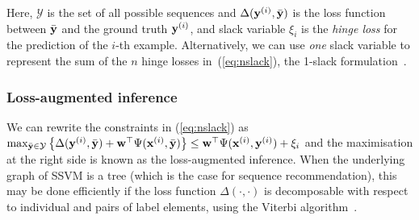 Here,
$\mathcal{Y}$ is the set of all possible sequences
and $\Delta(\mathbf{y}^{({i})}, \bar{\mathbf{y}})$ is the loss function between $\bar{\mathbf{y}}$ and the ground truth $\mathbf{y}^{({i})}$,
and slack variable $\xi_i$ is the \emph{hinge loss} for the prediction of the $i$-th example. %
Alternatively, we can use \emph{one} slack variable to represent the sum of the $n$ hinge losses in~(\ref{eq:nslack}),
\ie the 1-slack formulation~\cite{joachims2009predicting}.


\subsubsection{Loss-augmented inference}
We can rewrite the constraints in (\ref{eq:nslack}) as
$\max_{\bar{\mathbf{y}} \in \mathcal{Y}} \left\{ \Delta(\mathbf{y}^{({i})}, \bar{\mathbf{y}}) + \mathbf{w}^\top \Psi(\mathbf{x}^{({i})}, \bar{\mathbf{y}}) \right\} \le
\mathbf{w}^\top \Psi(\mathbf{x}^{({i})}, \mathbf{y}^{({i})}) + \xi_i$
and the maximisation at the right side is known as the loss-augmented inference.
When the underlying graph of SSVM is a tree (which is the case for sequence recommendation),
this may be done efficiently if the loss function $\Delta(\cdot,\cdot)$ is decomposable
with respect to individual and pairs of label elements,
\eg using the Viterbi algorithm~\cite{joachims2009predicting}.

